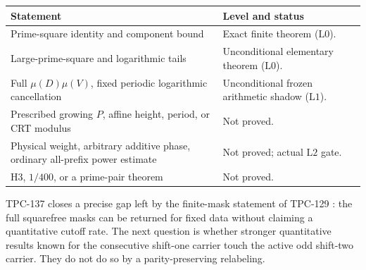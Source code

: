 \documentclass[11pt]{article}
\theoremstyle{definition}
\theoremstyle{remark}
\newcommand{\Lzero}{\mathrm{L0}}
\newcommand{\Lone}{\mathrm{L1}}
\newcommand{\Ltwo}{\mathrm{L2}}
\begin{document}
\begin{center}
\small
\begin{tabularx}{\textwidth}{@{}p{}X@{}}
\toprule
Statement & Level and status\\
\midrule
Prime-square identity and component bound
& Exact finite theorem (\(\Lzero\)).\\
Large-prime-square and logarithmic tails
& Unconditional elementary theorem (\(\Lzero\)).\\
Full \(\mu(D)\mu(V)\), fixed periodic logarithmic cancellation
& Unconditional frozen arithmetic shadow (\(\Lone\)).\\
Prescribed growing \(P\), affine height, period, or CRT modulus
& Not proved.\\
Physical weight, arbitrary additive phase, ordinary all-prefix
power estimate
& Not proved; actual \(\Ltwo\) gate.\\
H3, \(1/400\), or a prime-pair theorem
& Not proved.\\
\bottomrule
\end{tabularx}
\end{center}

TPC-137 closes a precise gap left by the finite-mask statement of
TPC-129 \citep{WangTPC129}: the full squarefree masks can be returned
for fixed data without claiming a quantitative cutoff rate.  The
next question is whether stronger quantitative results known for
the consecutive shift-one carrier touch the active odd shift-two
carrier.  They do not do so by a parity-preserving relabeling.

\begingroup
\footnotesize
\raggedright


\endgroup
\end{document}

